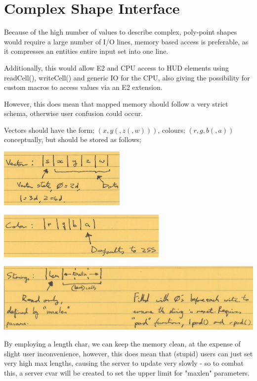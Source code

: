 \documentclass[10pt,a4paper]{article}
\begin{document}
\section{Complex Shape Interface}

Because of the high number of values to describe complex, poly-point shapes would require a large number of I/O lines, memory based access is preferable, as it compresses an entities entire input set into one line.

Additionally, this would allow E2 and CPU access to HUD elements using readCell(), writeCell() and generic IO for the CPU, also giving the possibility for custom macros to access values via an E2 extension.

However, this does mean that mapped memory should follow a very strict schema, otherwise user confusion could occur.

Vectors should have the form; $(x,y(,z(,w)))$, colours; $(r,g,b(,a))$ conceptually, but should be stored as follows;

\includegraphics[scale=0.75]{images/memory/vector_format.png}

\includegraphics[scale=0.75]{images/memory/color_format.png}

\includegraphics[scale=0.75]{images/memory/string_format.png}

By employing a length char, we can keep the memory clean, at the expense of slight user inconvenience, however, this does mean that (stupid) users can just set very high max lengths, causing the server to update very slowly - so to combat this, a server cvar will be created to set the upper limit for "maxlen" parameters.
\end{document}
